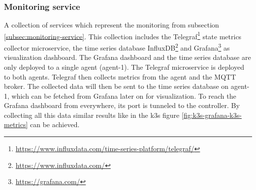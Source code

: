 \subsubsection*{Monitoring service}
A collection of services which represent the monitoring from subsection \ref{subsec:monitoring-service}. This collection includes the Telegraf\footnote{\url{https://www.influxdata.com/time-series-platform/telegraf/}} state metrics collector microservice, the time series database InfluxDB\footnote{\url{https://www.influxdata.com/}} and Grafana\footnote{\url{https://grafana.com/}} as visualization dashboard. The Grafana dashboard and the time series database are only deployed to a single agent (agent-1). The Telegraf microservice is deployed to both agents. Telegraf then collects metrics from the agent and the MQTT broker. The collected data will then be sent to the time series database on agent-1, which can be fetched from Grafana later on for visualization. To reach the Grafana dashboard from everywhere, its port is tunneled to the controller. By collecting all this data similar results like in the k3s figure \ref{fig:k3s-grafana-k3s-metrics} can be achieved.
